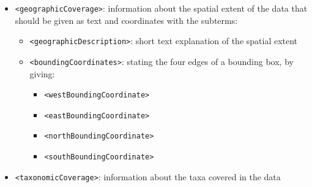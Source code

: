 \documentclass[
  oneside]{book}
\providecommand{\tightlist}{%
  \setlength{\itemsep}{0pt}\setlength{\parskip}{0pt}}
\begin{document}
\begin{itemize}
\begin{itemize}
\begin{itemize}
      \begin{itemize}
      \tightlist
      \item
        \texttt{\textless{}calendarDate\textgreater{}}
      \item
        \texttt{\textless{}time\textgreater{}}
      \item
        \texttt{\textless{}alternativeTimeScale\textgreater{}}: can describe alternative time scale, e.g., geological date, with a range of subterms
      \end{itemize}
    \item
      \texttt{\textless{}rangeOfDates\textgreater{}}: allows to describe a time range by specifying start and end date (with the same subterms as for singleDateTime). Can be repeated if there are several time ranges that need to be described.

      \begin{itemize}
      \tightlist
      \item
        \texttt{\textless{}beginDate\textgreater{}}
      \item
        \texttt{\textless{}endDate\textgreater{}}
      \end{itemize}
    \end{itemize}
  \item
    {\texttt{\textless{}geographicCoverage\textgreater{}}}: information about the spatial extent of the data that should be given as text and coordinates with the subterms:

    \begin{itemize}
    \tightlist
    \item
      \texttt{\textless{}geographicDescription\textgreater{}}: short text explanation of the spatial extent
    \item
      \texttt{\textless{}boundingCoordinates\textgreater{}}: stating the four edges of a bounding box, by giving:

      \begin{itemize}
      \tightlist
      \item
        \texttt{\textless{}westBoundingCoordinate\textgreater{}}
      \item
        \texttt{\textless{}eastBoundingCoordinate\textgreater{}}
      \item
        \texttt{\textless{}northBoundingCoordinate\textgreater{}}
      \item
        \texttt{\textless{}southBoundingCoordinate\textgreater{}}
      \end{itemize}
    \end{itemize}
  \item
    {\texttt{\textless{}taxonomicCoverage\textgreater{}}}: information about the taxa covered in the data


\end{itemize}
\end{itemize}
\end{document}
